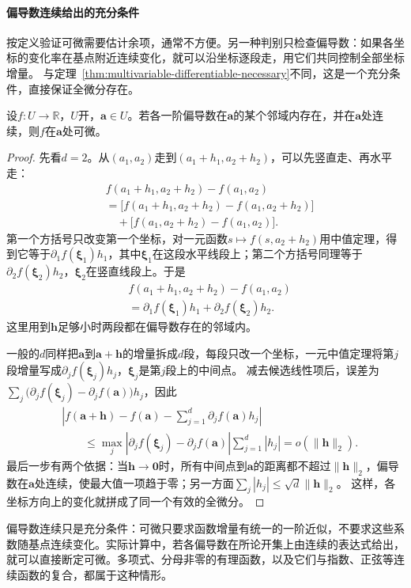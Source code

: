 \paragraph{偏导数连续给出的充分条件}
按定义验证可微需要估计余项，通常不方便。另一种判别只检查偏导数：如果各坐标的变化率在基点附近连续变化，就可以沿坐标逐段走，用它们共同控制全部坐标增量。
与定理~\ref{thm:multivariable-differentiable-necessary}不同，这是一个充分条件，直接保证全微分存在。
\begin{theorem}[偏导数连续与可微性]
\label{thm:multivariable-continuous-partials-sufficient}
设$f:U\to\mathbb R$，$U$开，$\bm a\in U$。若各一阶偏导数在$\bm a$的某个邻域内存在，并在$\bm a$处连续，则$f$在$\bm a$处可微。
\end{theorem}
\begin{proof}
先看$d=2$。从$(a_1,a_2)$走到$(a_1+h_1,a_2+h_2)$，可以先竖直走、再水平走：
\[
 \begin{aligned}
 &f(a_1+h_1,a_2+h_2)-f(a_1,a_2)\\
 &=\bigl[f(a_1+h_1,a_2+h_2)-f(a_1,a_2+h_2)\bigr]\\
 &\quad+\bigl[f(a_1,a_2+h_2)-f(a_1,a_2)\bigr].
 \end{aligned}
\]
第一个方括号只改变第一个坐标，对一元函数$s\mapsto f(s,a_2+h_2)$用中值定理，得到它等于$\partial_1f(\bm\xi_1)h_1$，其中$\bm\xi_1$在这段水平线段上；第二个方括号同理等于$\partial_2f(\bm\xi_2)h_2$，$\bm\xi_2$在竖直线段上。于是
\[
 \begin{aligned}
 &f(a_1+h_1,a_2+h_2)-f(a_1,a_2)\\
 &=\partial_1f(\bm\xi_1)h_1+\partial_2f(\bm\xi_2)h_2.
 \end{aligned}
\]
这里用到$\bm h$足够小时两段都在偏导数存在的邻域内。

一般的$d$同样把$\bm a$到$\bm a+\bm h$的增量拆成$d$段，每段只改一个坐标，一元中值定理将第$j$段增量写成$\partial_jf(\bm\xi_j)h_j$，$\bm\xi_j$是第$j$段上的中间点。
减去候选线性项后，误差为$\sum_j\bigl(\partial_jf(\bm\xi_j)-\partial_jf(\bm a)\bigr)h_j$，因此
\[
 \begin{aligned}
 &\left|f(\bm a+\bm h)-f(\bm a)-\sum_{j=1}^d\partial_j f(\bm a)h_j\right|\\
 &\qquad\leq \max_j\left|\partial_j f(\bm\xi_j)-\partial_j f(\bm a)\right|
       \sum_{j=1}^d|h_j|
 =o(\lVert\bm h\rVert_2).
 \end{aligned}
\]
最后一步有两个依据：当$\bm h\to\bm0$时，所有中间点到$\bm a$的距离都不超过$\lVert\bm h\rVert_2$，偏导数在$\bm a$处连续，使最大值一项趋于零；另一方面$\sum_j|h_j|\leq\sqrt d\lVert\bm h\rVert_2$。
这样，各坐标方向上的变化就拼成了同一个有效的全微分。
\end{proof}
偏导数连续只是充分条件：可微只要求函数增量有统一的一阶近似，不要求这些系数随基点连续变化。实际计算中，若各偏导数在所论开集上由连续的表达式给出，就可以直接断定可微。多项式、分母非零的有理函数，以及它们与指数、正弦等连续函数的复合，都属于这种情形。

